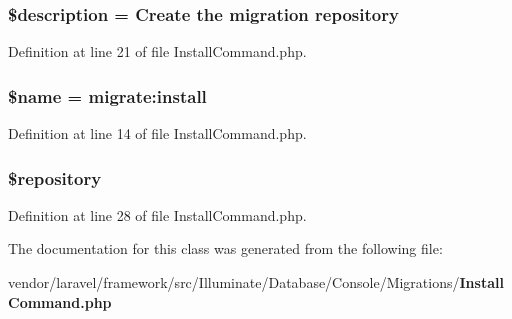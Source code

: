 \subsubsection[{\$description}]{\setlength{\rightskip}{0pt plus 5cm}\$description = \textquotesingle{}Create the migration repository\textquotesingle{}\hspace{0.3cm}{\ttfamily [protected]}}\label{class_illuminate_1_1_database_1_1_console_1_1_migrations_1_1_install_command_a87b032cba06009e3467abf1c8018d960}


Definition at line 21 of file Install\+Command.\+php.

\subsubsection[{\$name}]{\setlength{\rightskip}{0pt plus 5cm}\${\bf name} = \textquotesingle{}migrate\+:install\textquotesingle{}\hspace{0.3cm}{\ttfamily [protected]}}\label{class_illuminate_1_1_database_1_1_console_1_1_migrations_1_1_install_command_ab2fc40d43824ea3e1ce5d86dee0d763b}


Definition at line 14 of file Install\+Command.\+php.

\subsubsection[{\$repository}]{\setlength{\rightskip}{0pt plus 5cm}\$repository\hspace{0.3cm}{\ttfamily [protected]}}\label{class_illuminate_1_1_database_1_1_console_1_1_migrations_1_1_install_command_a116ab346146cc30fbffb7ffc52cbd1b3}


Definition at line 28 of file Install\+Command.\+php.



The documentation for this class was generated from the following file\+:\begin{DoxyCompactItemize}
\item 
vendor/laravel/framework/src/\+Illuminate/\+Database/\+Console/\+Migrations/{\bf Install\+Command.\+php}\end{DoxyCompactItemize}
